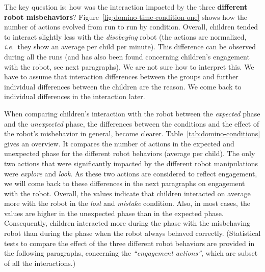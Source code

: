 \documentclass{sig-alternate}
\newcommand{\ie}{{\textit{i.e.~}}}
\begin{document}
The key question is: how was the interaction impacted by the three
\textbf{different robot misbehaviors}?
Figure~\ref{fig:domino-time-condition-one} shows how the number of actions
evolved from run to run by condition. Overall, children tended to interact
slightly less with the \textit{disobeying} robot (the actions are normalized,
\ie they show an average per child per minute). This difference can be observed
during all the runs (and has also been found concerning children's engagement
with the robot, see next paragraphs). We are not sure how to interpret this. We
have to assume that interaction differences between the groups and further
individual differences between the children are the reason. We come back to
individual differences in the interaction later.  


% 

When comparing children's interaction with the robot between the
\textit{expected} phase and the \textit{unexpected} phase, the differences
between the conditions and the effect of the robot's misbehavior in general,
become clearer. Table~\ref{tab:domino-conditions} gives an overview. It compares
the number of actions in the expected and unexpected phase for the different
robot behaviors (average per child). The only two actions that were
significantly impacted by the different robot manipulations were
\textit{explore} and \textit{look}. As these two actions are considered to
reflect engagement, we will come back to these differences in the next
paragraphs on engagement with the robot. Overall, the values indicate that
children interacted on average more with the robot in the \textit{lost} and
\textit{mistake} condition. Also, in most cases, the values are higher in the
unexpected phase than in the expected phase. Consequently, children interacted
more during the phase with the misbehaving robot than during the phase when the
robot always behaved correctly. (Statistical tests to compare the effect of the
three different robot behaviors are provided in the following paragraphs,
concerning the \textit{``engagement actions''}, which are subset of all the
interactions.)
\end{document}
